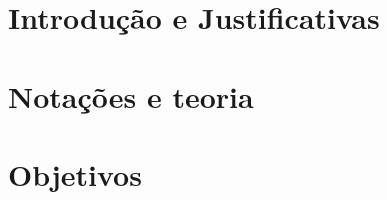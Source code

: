 \documentclass[11pt,a4paper]{article}
\theoremstyle{definition}
\begin{document}
\section{Introdução e Justificativas}
\label{sec:introducao}



\section{Notações e teoria}
\label{sec:notacoes}



\section{Objetivos}
\label{sec:objetivos}
\end{document}
